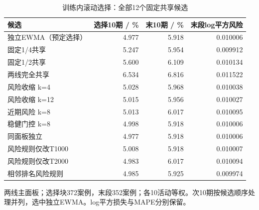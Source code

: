 \begin{table}[!htbp]\centering
\caption{训练内滚动选择：全部12个固定共享候选}\label{tab:round2adaptive}
\small\setlength{\tabcolsep}{4pt}
\begin{tabularx}{\linewidth}{L r r r}\toprule
候选 & 选择10期 / \% & 末10期 / \% & 末段log平方风险 \\
\midrule
独立EWMA（预定选择） & 4.977 & 5.918 & 0.010006 \\
固定1/4共享 & 5.247 & 5.954 & 0.009912 \\
固定1/2共享 & 5.600 & 6.109 & 0.010134 \\
两线完全共享 & 6.534 & 6.816 & 0.011522 \\
风险收缩 k=4 & 5.028 & 5.968 & 0.010038 \\
风险收缩 k=12 & 5.015 & 5.956 & 0.010027 \\
近期风险 k=8 & 5.013 & 6.017 & 0.010095 \\
稳健门控 k=8 & 4.998 & 5.918 & 0.010006 \\
同面板独立 & 4.977 & 5.918 & 0.010006 \\
风险规则仅改T1000 & 5.008 & 5.918 & 0.010007 \\
风险规则仅改T2000 & 4.983 & 6.017 & 0.010094 \\
相邻排名风险规则 & 4.985 & 5.925 & 0.009974 \\
\bottomrule\end{tabularx}
\par\vspace{3pt}\begin{minipage}{\linewidth}\footnotesize 两线主面板；选择块372案例，末段352案例；各10活动等权。次10期按候选顺序处理并列，选中独立EWMA。log平方损失与MAPE分别保留。\end{minipage}
\end{table}
